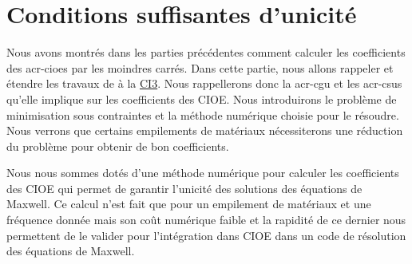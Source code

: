 \chapter{Conditions suffisantes d'unicité}
\label{sec:chap3}
\minitoc
\newpage
{}
Nous avons montrés dans les parties précédentes comment calculer les coefficients des \glspl{acr-cioe} par les moindres carrés. Dans cette partie, nous allons rappeler et étendre les travaux de \cite{stupfel_sufficient_2011} à la \hyperlink{ci3}{CI3}. Nous rappellerons donc la \gls{acr-cgu} et les \glspl{acr-csu} qu'elle implique sur les coefficients des CIOE. Nous introduirons le problème de minimisation sous contraintes et la méthode numérique choisie pour le résoudre. Nous verrons que certains empilements de matériaux nécessiterons une réduction du problème pour obtenir de bon coefficients.





%
Nous nous sommes dotés d'une méthode numérique pour calculer les coefficients des CIOE qui permet de garantir l'unicité des solutions des équations de Maxwell. Ce calcul n'est fait que pour un empilement de matériaux et une fréquence donnée mais son coût numérique faible et la rapidité de ce dernier nous permettent de le valider pour l'intégration dans CIOE dans un code de résolution des équations de Maxwell.